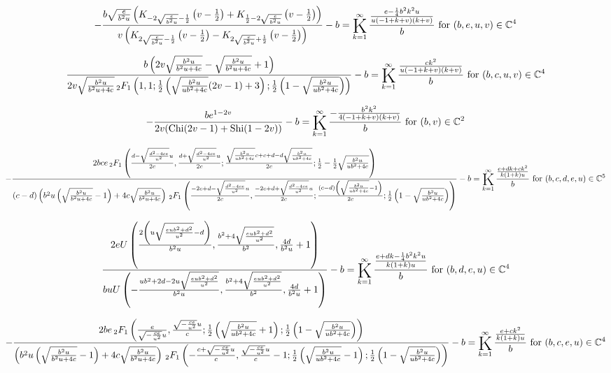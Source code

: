 \documentclass{article}
\newcommand{\bigK}{\mathop{\raisebox{-5pt}{\huge K}}}
\begin{document}
\[-\frac{b \sqrt{\frac{e}{b^2 u}} \left(K_{-2 \sqrt{\frac{e}{b^2 u}}-\frac{1}{2}}\left(v-\frac{1}{2}\right)+K_{\frac{1}{2}-2 \sqrt{\frac{e}{b^2 u}}}\left(v-\frac{1}{2}\right)\right)}{v \left(K_{2 \sqrt{\frac{e}{b^2 u}}-\frac{1}{2}}\left(v-\frac{1}{2}\right)-K_{2 \sqrt{\frac{e}{b^2 u}}+\frac{1}{2}}\left(v-\frac{1}{2}\right)\right)}-b=\bigK_{k=1}^{\infty}\frac{\frac{e-\frac{1}{4} b^2 k^2 u}{u (-1+k+v) (k+v)}}{b}\text{ for }(b,e,u,v)\in \mathbb{C}^4\] 

\[\frac{b \left(2 v \sqrt{\frac{b^2 u}{b^2 u+4 c}}-\sqrt{\frac{b^2 u}{b^2 u+4 c}}+1\right)}{2 v \sqrt{\frac{b^2 u}{b^2 u+4 c}} \, _2F_1\left(1,1;\frac{1}{2} \left(\sqrt{\frac{b^2 u}{u b^2+4 c}} (2 v-1)+3\right);\frac{1}{2} \left(1-\sqrt{\frac{b^2 u}{u b^2+4 c}}\right)\right)}-b=\bigK_{k=1}^{\infty}\frac{\frac{c k^2}{u (-1+k+v) (k+v)}}{b}\text{ for }(b,c,u,v)\in \mathbb{C}^4\] 

\[-\frac{b e^{1-2 v}}{2 v (\text{Chi}(2 v-1)+\text{Shi}(1-2 v))}-b=\bigK_{k=1}^{\infty}\frac{-\frac{b^2 k^2}{4 (-1+k+v) (k+v)}}{b}\text{ for }(b,v)\in \mathbb{C}^2\] 

\[-\frac{2 b c e \, _2F_1\left(\frac{d-\sqrt{\frac{d^2-4 c e}{u^2}} u}{2 c},\frac{d+\sqrt{\frac{d^2-4 c e}{u^2}} u}{2 c};\frac{\sqrt{\frac{b^2 u}{u b^2+4 c}} c+c+d-d \sqrt{\frac{b^2 u}{u b^2+4 c}}}{2 c};\frac{1}{2}-\frac{1}{2} \sqrt{\frac{b^2 u}{u b^2+4 c}}\right)}{(c-d) \left(b^2 u \left(\sqrt{\frac{b^2 u}{b^2 u+4 c}}-1\right)+4 c \sqrt{\frac{b^2 u}{b^2 u+4 c}}\right) \, _2F_1\left(\frac{-2 c+d-\sqrt{\frac{d^2-4 c e}{u^2}} u}{2 c},\frac{-2 c+d+\sqrt{\frac{d^2-4 c e}{u^2}} u}{2 c};\frac{(c-d) \left(\sqrt{\frac{b^2 u}{u b^2+4 c}}-1\right)}{2 c};\frac{1}{2} \left(1-\sqrt{\frac{b^2 u}{u b^2+4 c}}\right)\right)}-b=\bigK_{k=1}^{\infty}\frac{\frac{e+d k+c k^2}{k (1+k) u}}{b}\text{ for }(b,c,d,e,u)\in \mathbb{C}^5\] 

\[\frac{2 e U\left(\frac{2 \left(u \sqrt{\frac{e u b^2+d^2}{u^2}}-d\right)}{b^2 u},\frac{b^2+4 \sqrt{\frac{e u b^2+d^2}{u^2}}}{b^2},\frac{4 d}{b^2 u}+1\right)}{b u U\left(-\frac{u b^2+2 d-2 u \sqrt{\frac{e u b^2+d^2}{u^2}}}{b^2 u},\frac{b^2+4 \sqrt{\frac{e u b^2+d^2}{u^2}}}{b^2},\frac{4 d}{b^2 u}+1\right)}-b=\bigK_{k=1}^{\infty}\frac{\frac{e+d k-\frac{1}{4} b^2 k^2 u}{k (1+k) u}}{b}\text{ for }(b,d,e,u)\in \mathbb{C}^4\] 

\[-\frac{2 b e \, _2F_1\left(\frac{e}{\sqrt{-\frac{c e}{u^2}} u},\frac{\sqrt{-\frac{c e}{u^2}} u}{c};\frac{1}{2} \left(\sqrt{\frac{b^2 u}{u b^2+4 c}}+1\right);\frac{1}{2} \left(1-\sqrt{\frac{b^2 u}{u b^2+4 c}}\right)\right)}{\left(b^2 u \left(\sqrt{\frac{b^2 u}{b^2 u+4 c}}-1\right)+4 c \sqrt{\frac{b^2 u}{b^2 u+4 c}}\right) \, _2F_1\left(-\frac{c+\sqrt{-\frac{c e}{u^2}} u}{c},\frac{\sqrt{-\frac{c e}{u^2}} u}{c}-1;\frac{1}{2} \left(\sqrt{\frac{b^2 u}{u b^2+4 c}}-1\right);\frac{1}{2} \left(1-\sqrt{\frac{b^2 u}{u b^2+4 c}}\right)\right)}-b=\bigK_{k=1}^{\infty}\frac{\frac{e+c k^2}{k (1+k) u}}{b}\text{ for }(b,c,e,u)\in \mathbb{C}^4\] 
\end{document}
